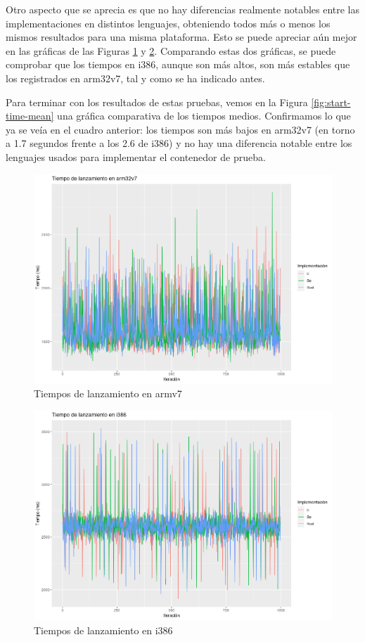 Otro aspecto que se aprecia es que no hay diferencias realmente notables entre
las implementaciones en distintos lenguajes, obteniendo todos más o menos los
mismos resultados para una misma plataforma. Esto se puede apreciar aún mejor en
las gráficas de las Figuras \ref{fig:start-time-arm} y
\ref{fig:start-time-i386}. Comparando estas dos gráficas, se puede comprobar que
los tiempos en i386, aunque son más altos, son más estables que los registrados
en arm32v7, tal y como se ha indicado antes.

Para terminar con los resultados de estas pruebas, vemos en la Figura
\ref{fig:start-time-mean} una gráfica comparativa de los tiempos medios.
Confirmamos lo que ya se veía en el cuadro anterior: los tiempos son más bajos
en arm32v7 (en torno a 1.7 segundos frente a los 2.6 de i386) y no hay una
diferencia notable entre los lenguajes usados para implementar el contenedor de
prueba.

\begin{figure}
    \centering
    \includegraphics[width=\textwidth]{images/start-time/arm.png}
    \caption{Tiempos de lanzamiento en armv7}
    \label{fig:start-time-arm}
\end{figure}

\begin{figure}
    \centering
    \includegraphics[width=\textwidth]{images/start-time/i386.png}
    \caption{Tiempos de lanzamiento en i386}
    \label{fig:start-time-i386}
\end{figure}

